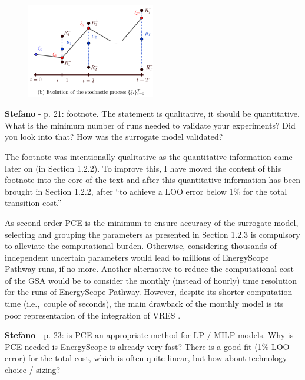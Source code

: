 \documentclass[12pt,a4paper]{article}
\def\ie{i.e.,\ }
\begin{document}
\begin{figure}[htbp!]
\centering
\includegraphics[width=0.5\textwidth]{Guevara.png}
\label{fig:Guevara}
\end{figure}

\begin{mdframed}[style=comment] %
{\color{orange} \textbf{Stefano}} - p. 21: footnote. The statement is qualitative, it should be quantitative. What is the minimum number of runs needed to validate your experiments? Did you look into that? How was the surrogate model validated?
\end{mdframed}

\noindent The footnote was intentionally qualitative as the quantitative information came later on (in Section 1.2.2). To improve this, I have moved the content of this footnote into the core of the text and after this quantitative information has been brought {\color{blue}in Section 1.2.2, after ``to achieve a LOO error below 1\% for the total transition cost.''}

\begin{mdframed}[style=manuscript] %
As second order PCE is the minimum to ensure accuracy of the surrogate model, selecting and grouping the parameters as presented in Section 1.2.3 is compulsory to alleviate the computational burden. Otherwise, considering thousands of independent uncertain parameters would lead to millions of EnergyScope Pathway runs, if no more. Another alternative to reduce the computational cost of the GSA would be to consider the monthly (instead of hourly) time resolution for the runs of EnergyScope Pathway. However, despite its shorter computation time (\ie couple of seconds), the main drawback of the monthly model is its poor representation of the integration of VRES \cite{limpens2024pathway}. 
\end{mdframed}

\begin{mdframed}[style=comment] %
{\color{orange} \textbf{Stefano}} - p. 23: is PCE an appropriate method for LP / MILP models. Why is PCE needed is EnergyScope is already very fast? There is a good fit (1\% LOO error) for the total cost, which is often quite linear, but how about technology choice / sizing?
\end{mdframed}
\end{document}
